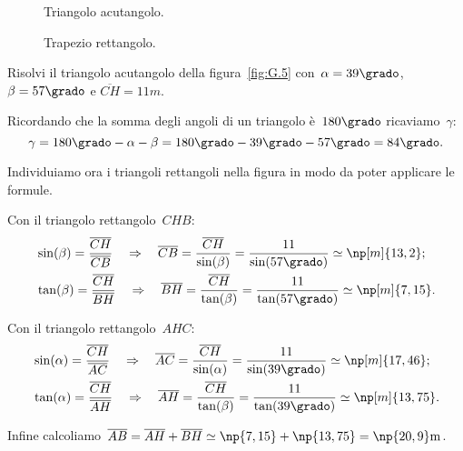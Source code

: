 \begin{figure}[b]
\begin{minipage}[t]{.45\textwidth}
 \centering
 
 \caption{Triangolo acutangolo.}\label{fig:G.5}
\end{minipage}\hfil
\begin{minipage}[t]{.45\textwidth}
\centering
 
\caption{Trapezio rettangolo.}\label{fig:G.6}
\end{minipage}
 \end{figure}

\begin{exrig}
 \begin{esempio}
Risolvi il triangolo acutangolo della figura~\ref{fig:G.5} con~$\alpha=39\grado$, $\beta=57\grado$ e $\overline{CH}=11\unit{m}$.

Ricordando che la somma degli angoli di un triangolo è~$180\grado$ ricaviamo~$\gamma$:
\[ \gamma =180\grado-\alpha -\beta =180\grado-39\grado-57\grado=84\grado.\]

Individuiamo ora i triangoli rettangoli nella figura in modo da poter applicare le formule.

Con il triangolo rettangolo~$CHB$:
\begin{align*}
 &\sin(\beta)=\frac{\overline{CH}}{\overline{CB}} \quad\Rightarrow\quad \overline{CB}=\frac{\overline{CH}}{\sin(\beta)}=
    \frac{11}{\sin(57\grado)}\simeq \np[m]{13,2};\\
&\tan(\beta)=\frac{\overline{CH}}{\overline{BH}} \quad\Rightarrow\quad \overline{BH}=\frac{\overline{CH}}{\tan(\beta)}=
    \frac{11}{\tan(57\grado)}\simeq \np[m]{7,15}.
\end{align*}

Con il triangolo rettangolo~$AHC$:
\begin{align*}
&\sin(\alpha)=\frac{\overline{CH}}{\overline{AC}} \quad\Rightarrow\quad \overline{AC}=\frac{\overline{CH}}{\sin(\alpha)}=
    \frac{11}{\sin(39\grado)}\simeq \np[m]{17,46};\\
&\tan(\alpha)=\frac{\overline{CH}}{\overline{AH}} \quad\Rightarrow\quad \overline{AH}=\frac{\overline{CH}}{\tan(\beta)}=
    \frac{11}{\tan(39\grado)}\simeq \np[m]{13,75}.
\end{align*}

Infine calcoliamo~$\overline{AB}=\overline{AH}+\overline{BH}\simeq \np{7,15}+\np{13,75} = \np{20,9}\unit{m}$.
 \end{esempio}
\end{exrig}


